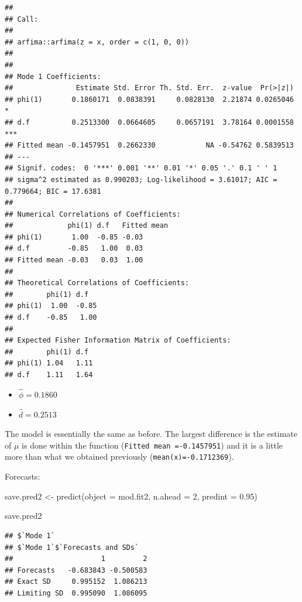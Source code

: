 \documentclass[
]{book}
\newenvironment{Shaded}{\begin{snugshade}}{\end{snugshade}}
\newcommand{\AttributeTok}[1]{\textcolor[rgb]{0.77,0.63,0.00}{#1}}
\newcommand{\DecValTok}[1]{\textcolor[rgb]{0.00,0.00,0.81}{#1}}
\newcommand{\FloatTok}[1]{\textcolor[rgb]{0.00,0.00,0.81}{#1}}
\newcommand{\FunctionTok}[1]{\textcolor[rgb]{0.00,0.00,0.00}{#1}}
\newcommand{\NormalTok}[1]{#1}
\newcommand{\OtherTok}[1]{\textcolor[rgb]{0.56,0.35,0.01}{#1}}
\theoremstyle{definition}
\theoremstyle{definition}
\theoremstyle{definition}
\theoremstyle{definition}
\theoremstyle{remark}
\begin{document}
\begin{verbatim}
## 
## Call:
##  
## arfima::arfima(z = x, order = c(1, 0, 0))
## 
## 
## Mode 1 Coefficients:
##               Estimate Std. Error Th. Std. Err.  z-value  Pr(>|z|)    
## phi(1)       0.1860171  0.0838391     0.0828130  2.21874 0.0265046 *  
## d.f          0.2513300  0.0664605     0.0657191  3.78164 0.0001558 ***
## Fitted mean -0.1457951  0.2662330            NA -0.54762 0.5839513    
## ---
## Signif. codes:  0 '***' 0.001 '**' 0.01 '*' 0.05 '.' 0.1 ' ' 1
## sigma^2 estimated as 0.990203; Log-likelihood = 3.61017; AIC = 0.779664; BIC = 17.6381
## 
## Numerical Correlations of Coefficients:
##             phi(1) d.f   Fitted mean
## phi(1)       1.00  -0.85 -0.03      
## d.f         -0.85   1.00  0.03      
## Fitted mean -0.03   0.03  1.00      
## 
## Theoretical Correlations of Coefficients:
##        phi(1) d.f  
## phi(1)  1.00  -0.85
## d.f    -0.85   1.00
## 
## Expected Fisher Information Matrix of Coefficients:
##        phi(1) d.f 
## phi(1) 1.04   1.11
## d.f    1.11   1.64
\end{verbatim}

\begin{itemize}
\item
  \(\hat \phi=0.1860\)
\item
  \(\hat d=0.2513\)
\end{itemize}

The model is essentially the same as before. The largest difference is the estimate of \(\mu\) is done within the function (\texttt{Fitted\ mean\ =-0.1457951}) and it is a little more than what we obtained previously (\texttt{mean(x)=-0.1712369}).

Forecasts:

\begin{Shaded}
\begin{Highlighting}[]
\NormalTok{save.pred2 }\OtherTok{\textless{}{-}} \FunctionTok{predict}\NormalTok{(}\AttributeTok{object =}\NormalTok{ mod.fit2, }\AttributeTok{n.ahead =} \DecValTok{2}\NormalTok{, }\AttributeTok{predint =} \FloatTok{0.95}\NormalTok{)}

\NormalTok{save.pred2}
\end{Highlighting}
\end{Shaded}

\begin{verbatim}
## $`Mode 1`
## $`Mode 1`$`Forecasts and SDs`
##                     1         2
## Forecasts   -0.683843 -0.500583
## Exact SD     0.995152  1.086213
## Limiting SD  0.995090  1.086095
\end{verbatim}
\end{document}
